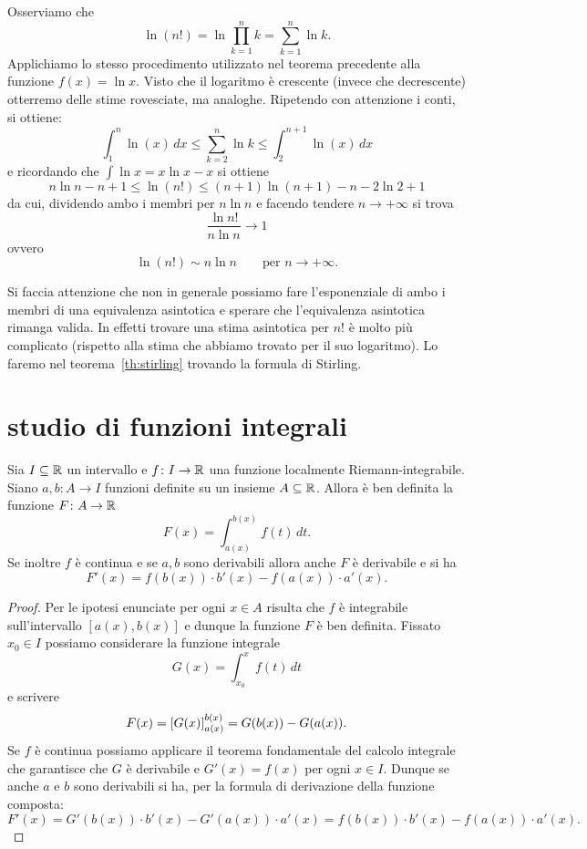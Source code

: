 \begin{example}
\label{ex:498124}%
%
%
Osserviamo che
\[
  \ln (n!) = \ln \prod_{k=1}^n k = \sum_{k=1}^n \ln k.
\]
Applichiamo lo stesso procedimento utilizzato nel teorema precedente alla
funzione $f(x) = \ln x$. Visto che il logaritmo è crescente
(invece che decrescente) otterremo delle stime rovesciate, ma analoghe.
 Ripetendo con attenzione i conti, si ottiene:
\[
    \int_1^n \ln(x)\, dx \le  \sum_{k=2}^n \ln k \le \int_2^{n+1} \ln(x) \, dx
\]
e ricordando che $\int \ln x = x \ln x - x$ si ottiene
\[
  n \ln n - n + 1 \le \ln(n!) \le (n+1) \ln (n+1) - n - 2\ln 2 + 1
\]
da cui, dividendo ambo i membri per $n \ln n$ e facendo tendere $n\to +\infty$ si trova
\[
 \frac{\ln n!}{n \ln n}\to 1
\]
ovvero
\[
  \ln (n!) \sim n \ln n \qquad \text{per $n\to +\infty$.}
\]

Si faccia attenzione che non in generale possiamo fare l'esponenziale di ambo i membri di una equivalenza asintotica
e sperare che l'equivalenza asintotica rimanga valida.
In effetti trovare una stima asintotica per $n!$ è molto più complicato (rispetto alla stima che abbiamo 
trovato per il suo logaritmo).
Lo faremo nel teorema~\ref{th:stirling} trovando la formula di Stirling.
\end{example}

\section{studio di funzioni integrali}

\begin{theorem}
Sia $I\subseteq \mathbb R$ un intervallo e $f\colon I \to \mathbb R$
una funzione localmente Riemann-integrabile.
Siano $a,b\colon A \to I$ funzioni definite
su un insieme $A \subseteq \mathbb R$.
Allora è ben definita la funzione $F\colon A \to \mathbb R$
\[
  F(x) = \int_{a(x)}^{b(x)} f(t)\, dt.
\]
Se inoltre $f$ è continua e se $a,b$ sono derivabili
allora anche $F$ è derivabile e si ha
\[
  F'(x) = f(b(x)) \cdot b'(x) - f(a(x)) \cdot a'(x).
\]
\end{theorem}
%
\begin{proof}
Per le ipotesi enunciate per ogni $x\in A$ risulta
che $f$ è integrabile sull'intervallo $[a(x),b(x)]$
e dunque la funzione $F$ è ben definita.
Fissato $x_0\in I$
possiamo considerare la funzione integrale
\[
  G(x) = \int_{x_0}^x f(t)\, dt
\]
e scrivere
\[
  F(x)
    = {\left[ G(x) \right]}_{a(x)}^{b(x)}
    = G(b(x)) - G(a(x)).
\]
Se $f$ è continua possiamo applicare il
teorema fondamentale del calcolo integrale
che garantisce che $G$ è derivabile e $G'(x) = f(x)$
per ogni $x\in I$. Dunque se anche $a$ e $b$
sono derivabili si ha, per la formula di derivazione
della funzione composta:
\[
F'(x)
= G'(b(x)) \cdot b'(x) - G'(a(x)) \cdot a'(x)
= f(b(x)) \cdot b'(x) - f(a(x)) \cdot a'(x).
\]
\end{proof}

